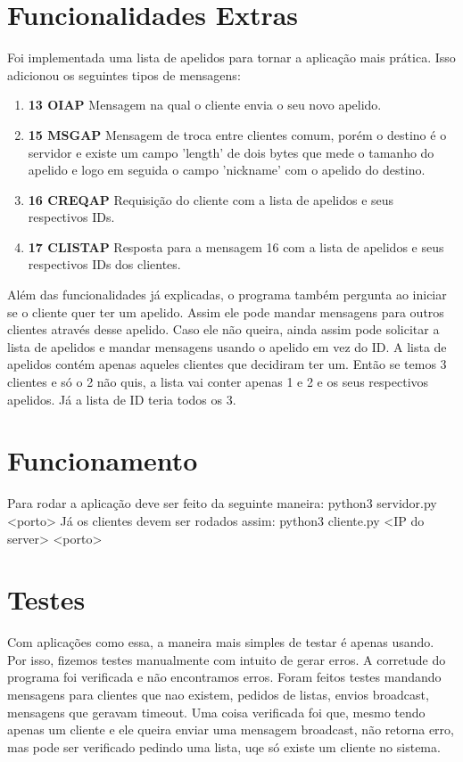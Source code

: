 \documentclass[10pt]{article}
\begin{document}
	\section{Funcionalidades Extras}
	Foi implementada uma lista de apelidos para tornar a aplicação mais prática. Isso adicionou os seguintes tipos de mensagens:
	\begin{enumerate}
		\item[] \textbf{13 OIAP} Mensagem na qual o cliente envia o seu novo apelido.
		\item[] \textbf{15 MSGAP} Mensagem de troca entre clientes comum, porém o destino é o servidor e existe um campo 'length' de dois bytes que mede o tamanho do apelido e logo em seguida o campo 'nickname' com o apelido do destino.
		\item[] \textbf{16 CREQAP} Requisição do cliente com a lista de apelidos e seus respectivos IDs.
		\item[] \textbf{17 CLISTAP} Resposta para a mensagem 16 com a lista de apelidos e seus respectivos IDs dos clientes.
	\end{enumerate}
	 Além das funcionalidades já explicadas, o programa também pergunta ao iniciar se o cliente quer ter um apelido. Assim ele pode mandar mensagens para outros clientes através desse apelido. Caso ele não queira, ainda assim pode solicitar a lista de apelidos e mandar mensagens usando o apelido em vez do ID.
	 \newline A lista de apelidos contém apenas aqueles clientes que decidiram ter um. Então se temos 3 clientes e só o 2 não quis, a lista vai conter apenas 1 e 2 e os seus respectivos apelidos. Já a lista de ID teria todos os 3.
	\section{Funcionamento}
	Para rodar a aplicação deve ser feito da seguinte maneira:
	\newline python3 servidor.py <porto>
	\newline Já os clientes devem ser rodados assim:
	\newline python3 cliente.py <IP do server> <porto>
	\section{Testes}
	Com aplicações como essa, a maneira mais simples de testar é apenas usando. Por isso, fizemos testes manualmente com intuito de gerar erros. A corretude do programa foi verificada e não encontramos erros.
	\newline Foram feitos testes mandando mensagens para clientes que nao existem, pedidos de listas, envios broadcast, mensagens que geravam timeout. Uma coisa verificada foi que, mesmo tendo apenas um cliente e ele queira enviar uma mensagem broadcast, não retorna erro, mas pode ser verificado pedindo uma lista, uqe só existe um cliente no sistema.
\end{document}
